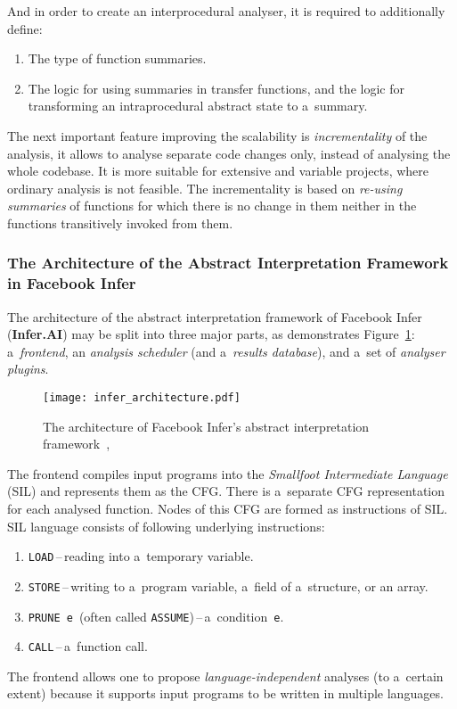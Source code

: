 And in order to create an interprocedural analyser, it is required to
additionally define:
\begin{enumerate}
    \item
        The type of function summaries.

    \item
        The logic for using summaries in transfer functions, and the logic
        for transforming an intraprocedural abstract state to
        a~summary.
\end{enumerate}
The next important feature improving the scalability is
\emph{incrementality} of the analysis, it allows to analyse separate
code changes only, instead of analysing the whole codebase. It is more
suitable for extensive and variable projects, where ordinary analysis
is not feasible. The incrementality is based on \emph{re-using summaries}
of functions for which there is no change in them neither in the functions
transitively invoked from them.

\subsubsection{%
    The Architecture of the Abstract Interpretation Framework in
    Facebook Infer
}

The architecture of the abstract interpretation framework of Facebook
Infer (\textbf{Infer.AI}) may be split into three major parts,
as demonstrates Figure~\ref{fig:inferArchitecture}: a~\emph{frontend},
an \emph{analysis scheduler} (and a~\emph{results database}), and a~set of
\emph{analyser plugins}.

\begin{figure}[hbt]
    \centering
    \texttt{[image: infer\_architecture.pdf]}
    \caption{%
        The architecture of Facebook Infer's abstract interpretation
        framework~\cite{inferAISlides}, \cite{projectPracticeMarcin2018}
    }
    \label{fig:inferArchitecture}
\end{figure}

The frontend compiles input programs into the \emph{Smallfoot Intermediate
Language} (SIL) and represents them as the CFG. There is a~separate CFG
representation for each analysed function. Nodes of this CFG are formed as
instructions of SIL. SIL language consists of following underlying
instructions:
\begin{enumerate}
    \item
        \texttt{LOAD}\,--\,reading into a~temporary variable.

    \item
        \texttt{STORE}\,--\,writing to a~program variable,
        a~field of a~structure, or an array.

    \item
        \texttt{PRUNE~e}~(often called
        \texttt{ASSUME})\,--\,a~condition~\texttt{e}.

    \item
        \texttt{CALL}\,--\,a~function call.
\end{enumerate}
The frontend allows one to propose \emph{language-independent} analyses
(to a~certain extent) because it supports input programs to be written
in multiple languages.


